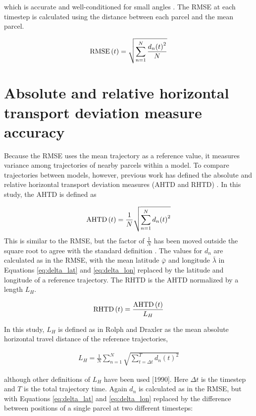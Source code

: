 which is accurate and well-conditioned for small angles \cite{sinnott_virtues_1984}. 
The RMSE at each timestep is calculated using the distance between each parcel and the mean parcel.

\begin{align}
    \operatorname{RMSE}{(t)} = \sqrt{ \sum_{n = 1}^{N} \frac{{d_n(t)}^2}{N} }
\end{align}

\section{Absolute and relative horizontal transport deviation measure accuracy}

Because the RMSE uses the mean trajectory as a reference value, it measures variance among trajectories of nearby parcels within a model.
To compare trajectories between models, however, previous work has defined the absolute and relative horizontal transport deviation measures (AHTD and RHTD) \cite{stohl_computation_1998}. 
In this study, the AHTD is defined as

\begin{align}
    \operatorname{AHTD}{(t)} = \frac{1}{N} \sqrt{ \sum_{n = 1}^{N} {d_n(t)}^2 }
\end{align}
This is similar to the RMSE, but the factor of $\frac{1}{N}$ has been moved outside the square root to agree with the standard definition \cite{kuo_accuracy_1985, rolph_sensitivity_1990}.
The values for $d_n$ are calculated as in the RMSE, with the mean latitude $\bar{\varphi}$ and longitude $\bar{\lambda}$ in Equations \ref{eq:delta_lat} and \ref{eq:delta_lon} replaced by the latitude and longitude of a reference trajectory.
The RHTD is the AHTD normalized by a length $L_H$.

\begin{align}
    \operatorname{RHTD}{(t)} = \frac{\operatorname{AHTD}{(t)}}{L_H}
\end{align}
 
In this study, $L_H$ is defined as in Rolph and Draxler as the mean absolute horizontal travel distance of the reference trajectories,

\begin{align}
    L_H = \frac{1}{N} \sum_{n = 1}^{N} \sqrt{ \sum_{t = \Delta t}^{T} {d_n(t)}^2}
\end{align}

although other definitions of $L_H$ have been used [1990].
Here $\Delta t$ is the timestep and $T$ is the total trajectory time.
Again $d_n$ is calculated as in the RMSE, but with Equations \ref{eq:delta_lat} and \ref{eq:delta_lon} replaced by the difference between positions of a single parcel at two different timesteps:

